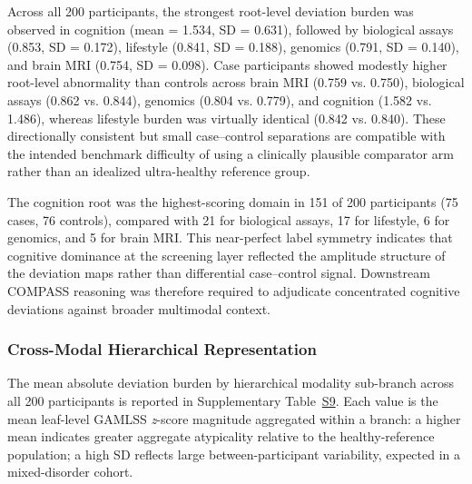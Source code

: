 \documentclass[11pt,a4paper,twoside]{article}
\begin{document}
Across all 200 participants, the strongest root-level deviation burden was observed in cognition (mean = 1.534, SD = 0.631), followed by biological assays (0.853, SD = 0.172), lifestyle (0.841, SD = 0.188), genomics (0.791, SD = 0.140), and brain MRI (0.754, SD = 0.098). Case participants showed modestly higher root-level abnormality than controls across brain MRI (0.759 vs. 0.750), biological assays (0.862 vs. 0.844), genomics (0.804 vs. 0.779), and cognition (1.582 vs. 1.486), whereas lifestyle burden was virtually identical (0.842 vs. 0.840). These directionally consistent but small case--control separations are compatible with the intended benchmark difficulty of using a clinically plausible comparator arm rather than an idealized ultra-healthy reference group.

The cognition root was the highest-scoring domain in 151 of 200 participants (75 cases, 76 controls), compared with 21 for biological assays, 17 for lifestyle, 6 for genomics, and 5 for brain MRI. This near-perfect label symmetry indicates that cognitive dominance at the screening layer reflected the amplitude structure of the deviation maps rather than differential case--control signal. Downstream COMPASS reasoning was therefore required to adjudicate concentrated cognitive deviations against broader multimodal context.

\subsubsection{Cross-Modal Hierarchical Representation}

The mean absolute deviation burden by hierarchical modality sub-branch across all 200 participants is reported in Supplementary Table~\hyperref[tab:s9]{S9}. Each value is the mean leaf-level GAMLSS \textit{z}-score magnitude aggregated within a branch: a higher mean indicates greater aggregate atypicality relative to the healthy-reference population; a high SD reflects large between-participant variability, expected in a mixed-disorder cohort.
\end{document}
